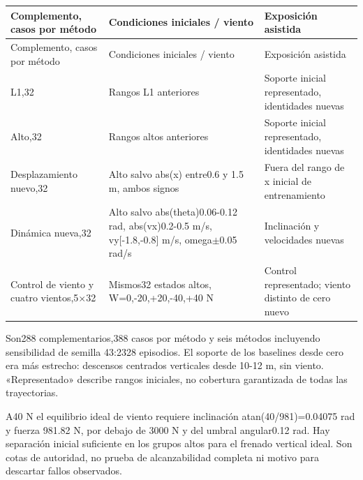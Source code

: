 \documentclass[12pt,a4paper]{article}
\begin{document}
\begingroup
\setlength{\tabcolsep}{3pt}
\renewcommand{\arraystretch}{1.35}
\fontsize{9.1}{11.8}\selectfont
\begin{longtable}{>{\raggedright\arraybackslash}p{0.3200\dimexpr\linewidth-18pt\relax}>{\raggedright\arraybackslash}p{0.3400\dimexpr\linewidth-18pt\relax}>{\raggedright\arraybackslash}p{0.3400\dimexpr\linewidth-18pt\relax}}
\toprule
\rowcolor{Pale}Complemento,\allowbreak{} casos por método & Condiciones iniciales /\allowbreak{} viento & Exposición asistida \\
\midrule
\endfirsthead
\toprule
\rowcolor{Pale}Complemento,\allowbreak{} casos por método & Condiciones iniciales /\allowbreak{} viento & Exposición asistida \\
\midrule
\endhead
\bottomrule\endfoot
L1,\allowbreak{}32 & Rangos L1 anteriores & Soporte inicial representado,\allowbreak{} identidades nuevas \\
Alto,\allowbreak{}32 & Rangos altos anteriores & Soporte inicial representado,\allowbreak{} identidades nuevas \\
Desplazamiento nuevo,\allowbreak{}32 & Alto salvo abs(x) entre0.6 y 1.5 m,\allowbreak{} ambos signos & Fuera del rango de x inicial de entrenamiento \\
Dinámica nueva,\allowbreak{}32 & Alto salvo abs(theta)0.06-0.12 rad,\allowbreak{} abs(vx)0.2-0.5 m/\allowbreak{}s,\allowbreak{} vy[-1.8,\allowbreak{}-0.8] m/\allowbreak{}s,\allowbreak{} omega\ensuremath{\pm}0.05 rad/\allowbreak{}s & Inclinación y velocidades nuevas \\
Control de viento y cuatro vientos,\allowbreak{}5\ensuremath{\times}32 & Mismos32 estados altos,\allowbreak{} W=0,\allowbreak{}-20,\allowbreak{}+20,\allowbreak{}-40,\allowbreak{}+40 N & Control representado; viento distinto de cero nuevo \\
\end{longtable}
\endgroup
Son288 complementarios,\allowbreak{}388 casos por método y seis métodos incluyendo sensibilidad de semilla 43:2328 episodios. El soporte de los baselines desde cero era más estrecho: descensos centrados verticales desde 10-12 m,\allowbreak{} sin viento. «Representado» describe rangos iniciales,\allowbreak{} no cobertura garantizada de todas las trayectorias.


A40 N el equilibrio ideal de viento requiere inclinación atan(40/\allowbreak{}981)=0.04075 rad y fuerza 981.82 N,\allowbreak{} por debajo de 3000 N y del umbral angular0.12 rad. Hay separación inicial suficiente en los grupos altos para el frenado vertical ideal. Son cotas de autoridad,\allowbreak{} no prueba de alcanzabilidad completa ni motivo para descartar fallos observados.
\end{document}
